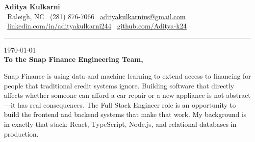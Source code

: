 \documentclass[11pt,letterpaper]{article}
\begin{document}
\begin{center}
    {\Huge \textbf{\color{SnapGreen} Aditya Kulkarni}}\\[8pt]
    {\color{DarkGrey} \small
    \faMapMarker* \ Raleigh, NC \quad \textbar \quad
    \faPhone \ (281) 876-7066 \quad \textbar \quad
    \faEnvelope \ \href{mailto:adityakulkarnius@gmail.com}{adityakulkarnius@gmail.com} \\[4pt]
    \faLinkedin \ \href{https://linkedin.com/in/adityakulkarni244}{linkedin.com/in/adityakulkarni244} \quad \textbar \quad
    \faGithub \ \href{https://github.com/Aditya-k24}{github.com/Aditya-k24}
    }
\end{center}

\vspace{-4pt}
{\color{SnapGreen}\rule{\linewidth}{1.5pt}}
\vspace{10pt}

\today\\[10pt]
\textbf{To the Snap Finance Engineering Team,}

\vspace{6pt}

Snap Finance is using data and machine learning to extend access to financing for people that traditional credit systems ignore. Building software that directly affects whether someone can afford a car repair or a new appliance is not abstract---it has real consequences. The Full Stack Engineer role is an opportunity to build the frontend and backend systems that make that work. My background is in exactly that stack: React, TypeScript, Node.js, and relational databases in production.

\vspace{4pt}
\end{document}
